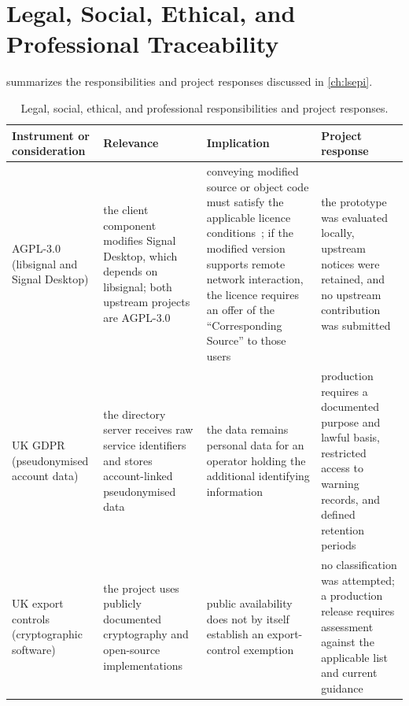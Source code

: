 \section{Legal, Social, Ethical, and Professional Traceability}\label{sec:trace-lsepi}

 summarizes the responsibilities and project responses discussed in
\cref{ch:lsepi}.

\begin{table}[p]
\centering
\caption{Legal, social, ethical, and professional responsibilities and project responses.}
\label{tab:lsepi-mapping}
\footnotesize
\setlength{\extrarowheight}{2pt}
\begin{tabularx}{\textwidth}{@{}>{\raggedright\arraybackslash}p{2.5cm}>{\raggedright\arraybackslash}X>{\raggedright\arraybackslash}X>{\raggedright\arraybackslash}X@{}}
\toprule
Instrument or consideration & Relevance & Implication & Project response \\
\midrule
AGPL-3.0 (libsignal and Signal Desktop) &
the client component modifies Signal Desktop, which depends on libsignal; both upstream projects are AGPL-3.0~\cite{libsignal,signal-desktop} &
conveying modified source or object code must satisfy the applicable licence conditions~\cite[Sections~5--6]{agpl3}; if the modified version supports remote network interaction, the licence requires an offer of the ``Corresponding Source'' to those users~\cite[Section~13]{agpl3} &
the prototype was evaluated locally, upstream notices were retained, and no upstream contribution was submitted \\

UK GDPR (pseudonymised account data) &
the directory server receives raw service identifiers and stores account-linked pseudonymised data &
the data remains personal data for an operator holding the additional identifying information~\cite{ico-pseudonymisation} &
production requires a documented purpose and lawful basis, restricted access to warning records, and defined retention periods~\cite{ico-lawfulness,ico-data-principles} \\

UK export controls (cryptographic software) &
the project uses publicly documented cryptography and open-source implementations &
public availability does not by itself establish an export-control exemption~\cite{uk-cryptonote} &
no classification was attempted; a production release requires assessment against the applicable list and current guidance~\cite{uk-export-lists} \\


\end{tabularx}
\end{table}
